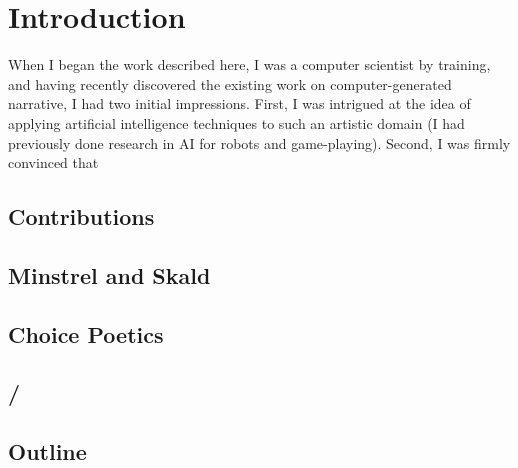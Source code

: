 \chapter{Introduction}

When I began the work described here, I was a computer scientist by training, and having recently discovered the existing work on computer-generated narrative, I had two initial impressions.
%
First, I was intrigued at the idea of applying artificial intelligence techniques to such an artistic domain (I had previously done research in AI for robots and game-playing).
%
Second, I was firmly convinced that %


\section{Contributions}

\section{Minstrel and Skald}

\section{Choice Poetics}

\section{\dunyazad/}

\section{Outline}
